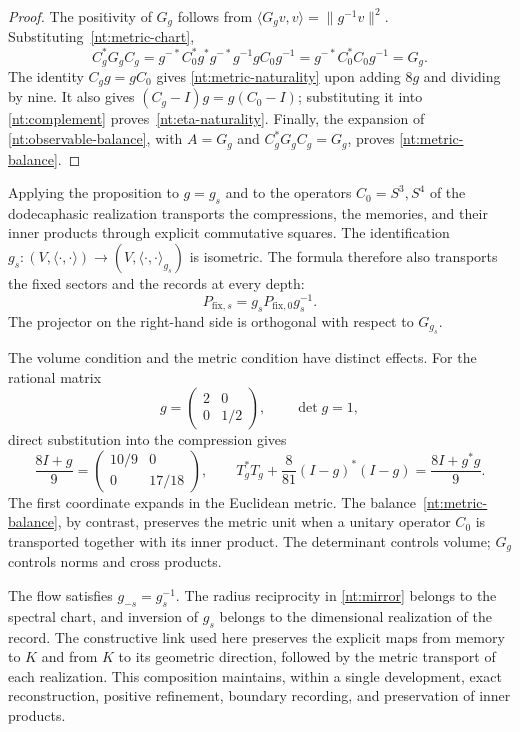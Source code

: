 \begin{proof}
The positivity of \(G_g\) follows from
\(\langle G_gv,v\rangle=\|g^{-1}v\|^2\).
Substituting~\eqref{nt:metric-chart},
\[
 C_g^*G_gC_g
 =g^{-*}C_0^*g^*g^{-*}g^{-1}gC_0g^{-1}
 =g^{-*}C_0^*C_0g^{-1}=G_g.
\]
The identity \(C_gg=gC_0\) gives
\eqref{nt:metric-naturality} upon adding \(8g\) and dividing
by nine. It also gives
\((C_g-I)g=g(C_0-I)\); substituting it into
\eqref{nt:complement} proves~\eqref{nt:eta-naturality}.
Finally, the expansion of
\eqref{nt:observable-balance}, with \(A=G_g\) and
\(C_g^*G_gC_g=G_g\), proves
\eqref{nt:metric-balance}.
\end{proof}

Applying the proposition to \(g=g_s\) and to the operators
\(C_0=S^3,S^4\) of the dodecaphasic realization transports
the compressions, the memories, and their inner products
through explicit commutative squares.
The identification \(g_s:(V,\langle\cdot,\cdot\rangle)
\to(V,\langle\cdot,\cdot\rangle_{g_s})\) is isometric.
The formula therefore also transports the fixed
sectors and the records at every depth:
\[
 P_{\mathrm{fix},s}
 =g_sP_{\mathrm{fix},0}g_s^{-1}.
\]
The projector on the right-hand side is orthogonal with respect
to \(G_{g_s}\).

The volume condition and the metric condition have
distinct effects. For the rational matrix
\[
 g=\begin{pmatrix}2&0\\0&1/2\end{pmatrix},
 \qquad \det g=1,
\]
direct substitution into the compression gives
\[
 \frac{8I+g}{9}
 =\begin{pmatrix}10/9&0\\0&17/18\end{pmatrix},
 \qquad
 T_g^*T_g+\frac8{81}(I-g)^*(I-g)
 =\frac{8I+g^*g}{9}.
\]
The first coordinate expands in the Euclidean
metric. The balance~\eqref{nt:metric-balance},
by contrast, preserves the metric unit when a
unitary operator \(C_0\) is transported together with
its inner product. The determinant controls
volume; \(G_g\) controls norms and cross
products.

The flow satisfies \(g_{-s}=g_s^{-1}\).
The radius reciprocity in
\eqref{nt:mirror} belongs to the spectral chart,
and inversion of \(g_s\) belongs to the
dimensional realization of the record. The constructive
link used here preserves the
explicit maps from memory to \(K\) and from
\(K\) to its geometric direction, followed by
the metric transport of each realization.
This composition maintains, within a single development,
exact reconstruction, positive refinement,
boundary recording, and preservation
of inner products.
